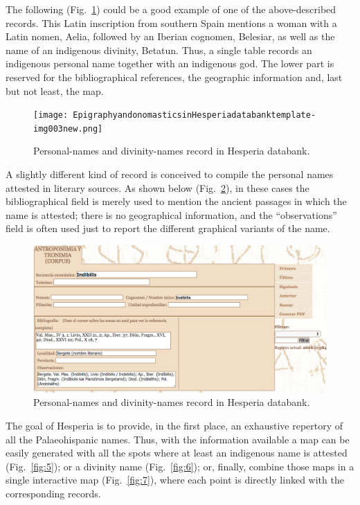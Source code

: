 \documentclass[amsthm,ebook]{saparticle}
\begin{document}
The following (Fig.~\ref{fig:3}) could be a good example of one of the above-described records. This Latin inscription from southern Spain
mentions a woman with a Latin nomen, Aelia, followed by an Iberian cognomen, Belesiar, as well as the name of an
indigenous divinity, Betatun. Thus, a single table records an indigenous personal name together with an indigenous god.
The lower part is reserved for the bibliographical references, the geographic information and, last but not least, the
map.

\begin{figure}[!hbp]
\centering
 \texttt{[image: EpigraphyandonomasticsinHesperiadatabanktemplate-img003new.png]}
\caption{Personal-names and divinity-names record in Hesperia databank.}
\label{fig:3}
\end{figure}


A slightly different kind of record is conceived to compile the personal names attested in literary sources. As shown
below (Fig.~\ref{fig:4}), in these cases the bibliographical field is merely used to mention the ancient passages in which the name is
attested; there is no geographical information, and the “observations” field is often used just to report the different
graphical variants of the name.


\begin{figure}[!hbp]
\centering
 \includegraphics[width=\columnwidth]{EpigraphyandonomasticsinHesperiadatabanktemplate-img004.png}
\caption{Personal-names and divinity-names record in Hesperia databank.}
\label{fig:4}
\end{figure}

The goal of Hesperia is to provide, in the first place, an exhaustive repertory of all the Palaeohispanic names. Thus,
with the information available a map can be easily generated with all the spots where at least an indigenous name is
attested (Fig.~\ref{fig:5}); or a divinity name (Fig.~\ref{fig:6}); or, finally, combine those maps in a single interactive map (Fig.~\ref{fig:7}), where each point is directly linked with the corresponding records.
\end{document}
